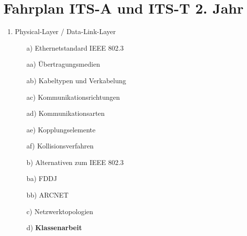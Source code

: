 \documentclass[10pt,a4paper]{article}
\begin{document}
\section*{Fahrplan ITS-A und ITS-T 2. Jahr}
\begin{enumerate}
	\item Physical-Layer / Data-Link-Layer
	\begin{enumerate}
		\item[a)] Ethernetstandard IEEE 802.3
		\item[aa)] Übertragungsmedien
		\item[ab)] Kabeltypen und Verkabelung
		\item[ac)] Kommunikationsrichtungen
		\item[ad)] Kommunikationsarten
		\item[ae)] Kopplungselemente
		\item[af)] Kollisionsverfahren
		\item[b)] Alternativen zum IEEE 802.3
		\item[ba)] FDDJ
		\item[bb)] ARCNET
		\item[c)] Netzwerktopologien
		\item[d)] \textbf{Klassenarbeit}
	\end{enumerate}
\end{enumerate}
\end{document}

